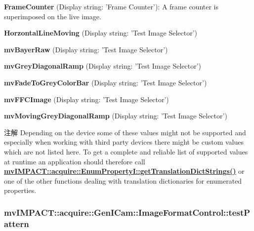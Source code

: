 \begin{DoxyItemize}
\item {\bfseries Frame\+Counter} (Display string\+: 'Frame Counter')\+: A frame counter is superimposed on the live image.
\item {\bfseries Horzontal\+Line\+Moving} (Display string\+: 'Test Image Selector')
\item {\bfseries mv\+Bayer\+Raw} (Display string\+: 'Test Image Selector')
\item {\bfseries mv\+Grey\+Diagonal\+Ramp} (Display string\+: 'Test Image Selector')
\item {\bfseries mv\+Fade\+To\+Grey\+Color\+Bar} (Display string\+: 'Test Image Selector')
\item {\bfseries mv\+F\+F\+C\+Image} (Display string\+: 'Test Image Selector')
\item {\bfseries mv\+Moving\+Grey\+Diagonal\+Ramp} (Display string\+: 'Test Image Selector')
\end{DoxyItemize}

\begin{DoxyNote}{注解}
Depending on the device some of these values might not be supported and especially when working with third party devices there might be custom values which are not listed here. To get a complete and reliable list of supported values at runtime an application should therefore call {\bfseries \hyperlink{classmv_i_m_p_a_c_t_1_1acquire_1_1_enum_property_i_a0ba6ccbf5ee69784d5d0b537924d26b6}{mv\+I\+M\+P\+A\+C\+T\+::acquire\+::\+Enum\+Property\+I\+::get\+Translation\+Dict\+Strings()}} or one of the other functions dealing with translation dictionaries for enumerated properties. 
\end{DoxyNote}
\hypertarget{classmv_i_m_p_a_c_t_1_1acquire_1_1_gen_i_cam_1_1_image_format_control_a34c6fda7818b0225f41f1cbca82cb8cd}{
\subsubsection[{test\+Pattern}]{ mv\+I\+M\+P\+A\+C\+T\+::acquire\+::\+Gen\+I\+Cam\+::\+Image\+Format\+Control\+::test\+Pattern}}\label{classmv_i_m_p_a_c_t_1_1acquire_1_1_gen_i_cam_1_1_image_format_control_a34c6fda7818b0225f41f1cbca82cb8cd}


